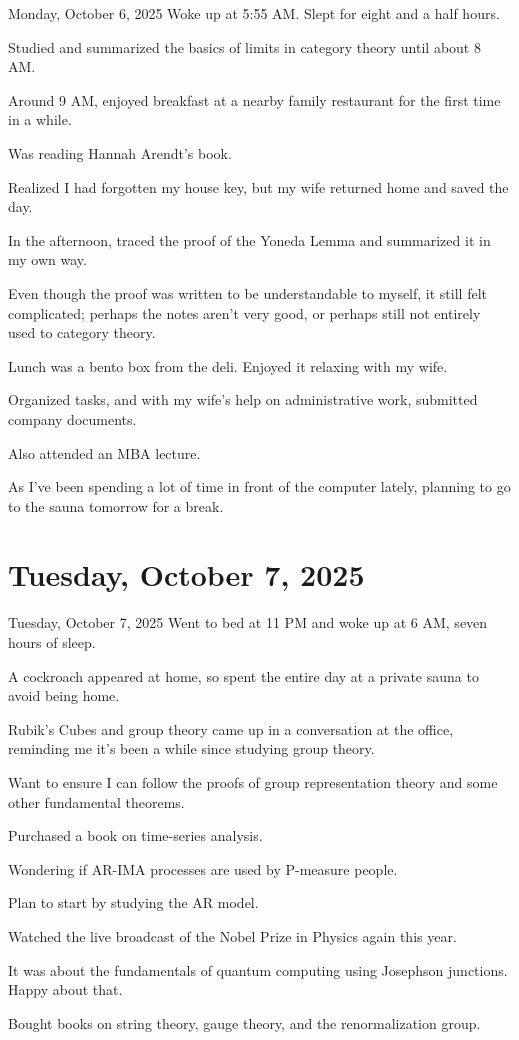 \documentclass[dvipdfmx, autodetect-engine, aspectratio=169, 10.5pt]{beamer}
\begin{document}
\begin{frame}{Monday, October 6, 2025}
	Woke up at 5:55 AM.
	Slept for eight and a half hours.

	Studied and summarized the basics of limits in category theory until about 8 AM.

	Around 9 AM, enjoyed breakfast at a nearby family restaurant for the first time in a while.

	Was reading Hannah Arendt's book.

	Realized I had forgotten my house key, but my wife returned home and saved the day.

	In the afternoon, traced the proof of the Yoneda Lemma and summarized it in my own way.

	Even though the proof was written to be understandable to myself, it still felt complicated; perhaps the notes aren't very good,
	or perhaps still not entirely used to category theory.

	Lunch was a bento box from the deli.
	Enjoyed it relaxing with my wife.

	Organized tasks, and with my wife's help on administrative work, submitted company documents.

	Also attended an MBA lecture.

	As I've been spending a lot of time in front of the computer lately, planning to go to the sauna tomorrow for a break.
\end{frame}

\section{Tuesday, October 7, 2025}

\begin{frame}{Tuesday, October 7, 2025}
	Went to bed at 11 PM and woke up at 6 AM, seven hours of sleep.

	A cockroach appeared at home, so spent the entire day at a private sauna to avoid being home.

	Rubik's Cubes and group theory came up in a conversation at the office, reminding me it's been a while since studying group theory.

	Want to ensure I can follow the proofs of group representation theory and some other fundamental theorems.

	Purchased a book on time-series analysis.

	Wondering if AR-IMA processes are used by P-measure people.

	Plan to start by studying the AR model.

	Watched the live broadcast of the Nobel Prize in Physics again this year.

	It was about the fundamentals of quantum computing using Josephson junctions. Happy about that.

	Bought books on string theory, gauge theory, and the renormalization group.
\end{frame}
\end{document}
